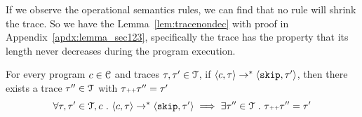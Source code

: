 %
If we observe the operational semantics rules, we can find that no rule will shrink the trace. 
So we have the Lemma~\ref{lem:tracenondec} with proof in Appendix~\ref{apdx:lemma_sec123}, 
specifically the trace has the property that its length never decreases during the program execution.
\begin{lem}
\label{lem:tracenondec}
For every program $c \in \mathcal{C}$ and traces $\mathtt{\tau}, \mathtt{\tau}' \in \mathcal{T}$, if 
$\langle c, \mathtt{\tau} \rangle \rightarrow^{*} \langle \mathtt{skip}, \mathtt{\tau}' \rangle$,
then there exists a trace $\mathtt{\tau}'' \in \mathcal{T}$ with $\mathtt{\tau} {\scriptscriptstyle ++} \mathtt{\tau}'' = \mathtt{\tau}'$
%
$$
\forall \mathtt{\tau}, \mathtt{\tau}' \in \mathcal{T}, c ~.~
\langle c, \mathtt{\tau} \rangle \rightarrow^{*} \langle \mathtt{skip}, \mathtt{\tau}' \rangle 
\implies \exists \mathtt{\tau}'' \in \mathcal{T} ~.~ \mathtt{\tau} {\scriptscriptstyle ++} \mathtt{\tau}'' = \mathtt{\tau}'
$$
\end{lem}
